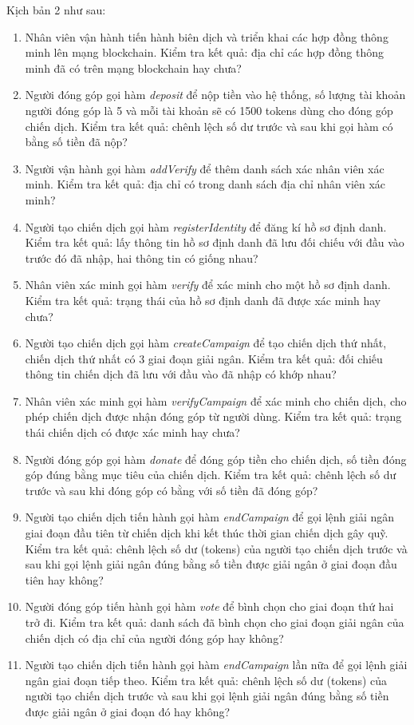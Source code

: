 \documentclass[../main-report.tex]{subfiles}
\begin{document}
Kịch bản 2 như sau:

\begin{enumerate}[label=(\arabic*)]
\item Nhân viên vận hành tiến hành biên dịch và triển khai các hợp đồng thông minh lên mạng blockchain. Kiểm tra kết quả: địa chỉ các hợp đồng thông minh đã có trên mạng blockchain hay chưa?
\item Người đóng góp gọi hàm \textit{deposit} để nộp tiền vào hệ thống, số lượng tài khoản người đóng góp là 5 và mỗi tài khoản sẽ có 1500 tokens dùng cho đóng góp chiến dịch. Kiểm tra kết quả: chênh lệch số dư trước và sau khi gọi hàm có bằng số tiền đã nộp?
\item Người vận hành gọi hàm \textit{addVerify} để thêm danh sách xác nhân viên xác minh. Kiểm tra kết quả: địa chỉ có trong danh sách địa chỉ nhân viên xác minh?
\item Người tạo chiến dịch gọi hàm \textit{registerIdentity} để đăng kí hồ sơ định danh. Kiểm tra kết quả: lấy thông tin hồ sơ định danh đã lưu đối chiếu với đầu vào trước đó đã nhập, hai thông tin có giống nhau?
\item Nhân viên xác minh gọi hàm \textit{verify} để xác minh cho một hồ sơ định danh. Kiểm tra kết quả: trạng thái của hồ sơ định danh đã được xác minh hay chưa?
\item Người tạo chiến dịch gọi hàm \textit{createCampaign} để tạo chiến dịch thứ nhất, chiến dịch thứ nhất có 3 giai đoạn giải ngân. Kiểm tra kết quả: đối chiếu thông tin chiến dịch đã lưu với đầu vào đã nhập có khớp nhau?
\item Nhân viên xác minh gọi hàm \textit{verifyCampaign} để xác minh cho chiến dịch, cho phép chiến dịch được nhận đóng góp từ người dùng. Kiểm tra kết quả: trạng thái chiến dịch có được xác minh hay chưa?
\item Người đóng góp gọi hàm \textit{donate} để đóng góp tiền cho chiến dịch, số tiền đóng góp đúng bằng mục tiêu của chiến dịch. Kiểm tra kết quả: chênh lệch số dư trước và sau khi đóng góp có bằng với số tiền đã đóng góp?
\item Người tạo chiến dịch tiến hành gọi hàm \textit{endCampaign} để gọi lệnh giải ngân giai đoạn đầu tiên từ chiến dịch khi kết thúc thời gian chiến dịch gây quỹ. Kiểm tra kết quả: chênh lệch số dư (tokens) của người tạo chiến dịch trước và sau khi gọi lệnh giải ngân đúng bằng số tiền được giải ngân ở giai đoạn đầu tiên hay không?
\item Người đóng góp tiến hành gọi hàm \textit{vote} để bình chọn cho giai đoạn thứ hai trở đi. Kiểm tra kết quả: danh sách đã bình chọn cho giai đoạn giải ngân của chiến dịch có địa chỉ của người đóng góp hay không?
\item Người tạo chiến dịch tiến hành gọi hàm \textit{endCampaign} lần nữa để gọi lệnh giải ngân giai đoạn tiếp theo. Kiểm tra kết quả: chênh lệch số dư (tokens) của người tạo chiến dịch trước và sau khi gọi lệnh giải ngân đúng bằng số tiền được giải ngân ở giai đoạn đó hay không?
\end{enumerate}
\end{document}
